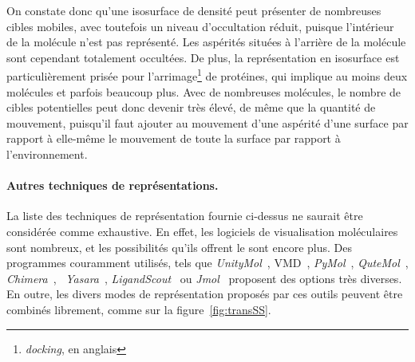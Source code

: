 	
	On constate donc qu'une isosurface de densité peut présenter de nombreuses cibles mobiles, avec toutefois un niveau d'occultation réduit, puisque l'intérieur de la molécule n'est pas représenté. Les aspérités situées à \og l'arrière \fg{} de la molécule sont cependant totalement occultées. De plus, la représentation en isosurface est particulièrement prisée pour l'arrimage\footnote{\emph{docking}, en anglais} de protéines, qui implique au moins deux molécules et parfois beaucoup plus. Avec de nombreuses molécules, le nombre de cibles potentielles peut donc devenir très élevé, de même que la quantité de mouvement, puisqu'il faut ajouter au mouvement d'une aspérité d'une surface par rapport à elle-même le mouvement de toute la surface par rapport à l'environnement.
	
	
	\paragraph{Autres techniques de représentations.}
	La liste des techniques de représentation fournie ci-dessus ne saurait être considérée comme exhaustive. En effet, les logiciels de visualisation moléculaires sont nombreux, et les possibilités qu'ils offrent le sont encore plus. Des programmes couramment utilisés, tels que \emph{UnityMol}~\cite{doutreligne2014unitymol}, VMD~\cite{humphrey1996vmd}, \emph{PyMol}~\cite{delano2002pymol}, \emph{QuteMol}~\cite{tarini2006ambient, tarini2006qutemol}, \emph{Chimera}~\cite{pettersen2004ucsf}, ~\emph{Yasara}~\cite{krieger2014yasara}, \emph{LigandScout}~\cite{wolber2005ligandscout} ou \emph{Jmol}~\cite{herraez2006biomolecules} proposent des options très diverses. En outre, les divers modes de représentation proposés par ces outils peuvent être combinés librement, comme sur la figure~\ref{fig:transSS}.
	

